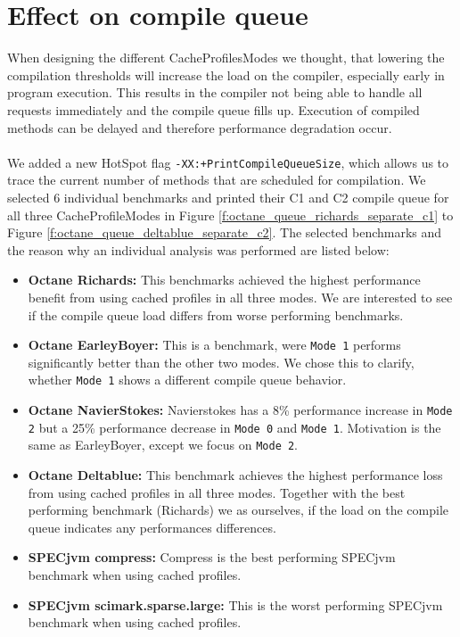 \section{Effect on compile queue}
\label{s:perf_compilequeue}
When designing the different CacheProfilesModes we thought, that lowering the compilation thresholds will increase the load on the compiler, especially early in program execution. This results in the compiler not being able to handle all requests immediately and the compile queue fills up. Execution of compiled methods can be delayed and therefore performance degradation occur.
\\\\
We added a new HotSpot flag \texttt{-XX:+PrintCompileQueueSize}, which allows us to trace the current number of methods that are scheduled for compilation. We selected 6 individual benchmarks and printed their C1 and C2 compile queue for all three CacheProfileModes in Figure \ref{f:octane_queue_richards_separate_c1} to Figure \ref{f:octane_queue_deltablue_separate_c2}.
The selected benchmarks and the reason why an individual analysis was performed are listed below:
\begin{itemize}
  \item \textbf{Octane Richards:} This benchmarks achieved the highest performance benefit from using cached profiles in all three modes. We are interested to see if the compile queue load differs from worse performing benchmarks.
  \item \textbf{Octane EarleyBoyer:} This is a benchmark, were \texttt{Mode 1} performs significantly better than the other two modes. We chose this to clarify, whether \texttt{Mode 1} shows a different compile queue behavior.
  \item \textbf{Octane NavierStokes:} Navierstokes has a 8\% performance increase in \texttt{Mode 2} but a 25\% performance decrease in \texttt{Mode 0} and \texttt{Mode 1}. Motivation is the same as EarleyBoyer, except we focus on \texttt{Mode 2}.
  \item \textbf{Octane Deltablue:} This benchmark achieves the highest performance loss from using cached profiles in all three modes. Together with the best performing benchmark (Richards) we as ourselves, if the load on the compile queue indicates any performances differences.
  \item \textbf{SPECjvm compress:} Compress is the best performing SPECjvm benchmark when using cached profiles. 
  \item \textbf{SPECjvm scimark.sparse.large:} This is the worst performing SPECjvm benchmark when using cached profiles. 
\end{itemize}
